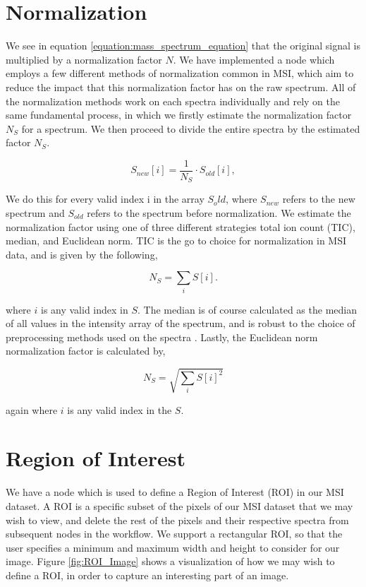 \documentclass[11pt,openany]{book}
\begin{document}
\section{Normalization}
We see in equation \ref{equation:mass_spectrum_equation} that the original signal is multiplied by a normalization factor $N$. We have implemented a node which employs a few different methods of normalization common in MSI, which aim to reduce the impact that this normalization factor has on the raw spectrum. All of the normalization methods work on each spectra individually and rely on the same fundamental process, in which we firstly estimate the normalization factor $N_S$ for a spectrum. We then proceed to divide the entire spectra by the estimated factor $N_S$.

\begin{equation}
    S_{new}[i] = \frac{ 1 }{ N_S } \cdot S_{old}[i], 
    \label{equation:normalization_divide}
\end{equation}

We do this for every valid index i in the array $S_old$, where $S_{new}$ refers to the new spectrum and $S_{old}$ refers to the spectrum before normalization. We estimate the normalization factor using one of three different strategies total ion count (TIC), median, and Euclidean norm. TIC is the go to choice for normalization in MSI data, and is given by the following, 

\begin{equation}
    N_{S} = \sum_i S[i].
    \label{equation:normalization_TIC_sum}
\end{equation}

where $i$ is any valid index in $S$. The median is of course calculated as the median of all values in the intensity array of the spectrum, and is robust to the choice of preprocessing methods used on the spectra \cite{alan_race_phd_thesis}. Lastly, the Euclidean norm normalization factor is calculated by, 

\begin{equation}
   N_{S} = \sqrt{  \sum_{i} {S[i]}^2   }
   \label{equation:normalization_Euclidean_norm_sum}
\end{equation}

again where $i$ is any valid index in the $S$.

\section{Region of Interest}
We have a node which is used to define a Region of Interest (ROI) in our MSI dataset. A ROI is a specific subset of the pixels of our MSI dataset that we may wish to view, and delete the rest of the pixels and their respective spectra from subsequent nodes in the workflow. We support a rectangular ROI, so that the user specifies a minimum and maximum width and height to consider for our image. Figure \ref{fig:ROI_Image} shows a visualization of how we may wish to define a ROI, in order to capture an interesting part of an image. 
\end{document}
